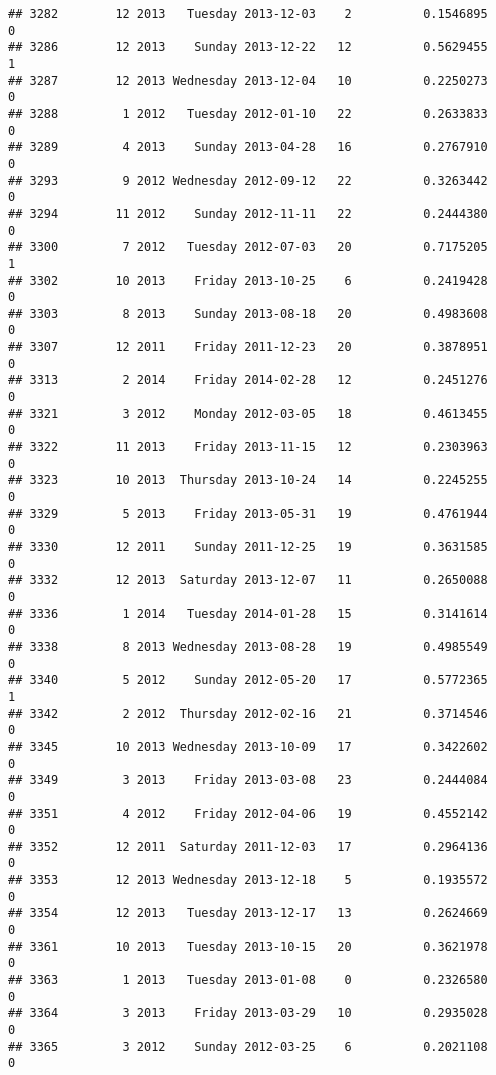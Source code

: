 \documentclass[
]{article}
\begin{document}
\begin{verbatim}
## 3282        12 2013   Tuesday 2013-12-03    2          0.1546895             0
## 3286        12 2013    Sunday 2013-12-22   12          0.5629455             1
## 3287        12 2013 Wednesday 2013-12-04   10          0.2250273             0
## 3288         1 2012   Tuesday 2012-01-10   22          0.2633833             0
## 3289         4 2013    Sunday 2013-04-28   16          0.2767910             0
## 3293         9 2012 Wednesday 2012-09-12   22          0.3263442             0
## 3294        11 2012    Sunday 2012-11-11   22          0.2444380             0
## 3300         7 2012   Tuesday 2012-07-03   20          0.7175205             1
## 3302        10 2013    Friday 2013-10-25    6          0.2419428             0
## 3303         8 2013    Sunday 2013-08-18   20          0.4983608             0
## 3307        12 2011    Friday 2011-12-23   20          0.3878951             0
## 3313         2 2014    Friday 2014-02-28   12          0.2451276             0
## 3321         3 2012    Monday 2012-03-05   18          0.4613455             0
## 3322        11 2013    Friday 2013-11-15   12          0.2303963             0
## 3323        10 2013  Thursday 2013-10-24   14          0.2245255             0
## 3329         5 2013    Friday 2013-05-31   19          0.4761944             0
## 3330        12 2011    Sunday 2011-12-25   19          0.3631585             0
## 3332        12 2013  Saturday 2013-12-07   11          0.2650088             0
## 3336         1 2014   Tuesday 2014-01-28   15          0.3141614             0
## 3338         8 2013 Wednesday 2013-08-28   19          0.4985549             0
## 3340         5 2012    Sunday 2012-05-20   17          0.5772365             1
## 3342         2 2012  Thursday 2012-02-16   21          0.3714546             0
## 3345        10 2013 Wednesday 2013-10-09   17          0.3422602             0
## 3349         3 2013    Friday 2013-03-08   23          0.2444084             0
## 3351         4 2012    Friday 2012-04-06   19          0.4552142             0
## 3352        12 2011  Saturday 2011-12-03   17          0.2964136             0
## 3353        12 2013 Wednesday 2013-12-18    5          0.1935572             0
## 3354        12 2013   Tuesday 2013-12-17   13          0.2624669             0
## 3361        10 2013   Tuesday 2013-10-15   20          0.3621978             0
## 3363         1 2013   Tuesday 2013-01-08    0          0.2326580             0
## 3364         3 2013    Friday 2013-03-29   10          0.2935028             0
## 3365         3 2012    Sunday 2012-03-25    6          0.2021108             0

\end{verbatim}
\end{document}
